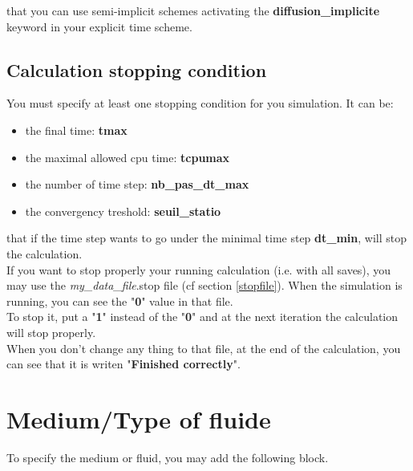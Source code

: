 \Note that you can use semi-implicit schemes activating the \textbf{diffusion\_implicite} keyword in your explicit time scheme.



\subsection{Calculation stopping condition}
You must specify at least one stopping condition for you simulation.
It can be:
\begin{itemize}
\item the final time: \textbf{tmax}
\item the maximal allowed cpu time: \textbf{tcpumax}
\item the number of time step: \textbf{nb\_pas\_dt\_max}
\item the convergency treshold: \textbf{seuil\_statio}
\end{itemize}

\Note that if the time step wants to go under the minimal time step \textbf{dt\_min}, \trust will stop the calculation.\\

If you want to stop properly your running calculation (i.e. with all saves), you may use the \textit{my\_data\_file}.stop file (cf section \ref{stopfile}).
When the simulation is running, you can see the "\textbf{0}" value in that file.\\

To stop it, put a "\textbf{1}" instead of the "\textbf{0}" and at the next iteration the calculation will stop properly.\\

When you don't change any thing to that file, at the end of the calculation, you can see that it is writen "\textbf{Finished correctly}".


\section{Medium/Type of fluide}
To specify the medium or fluid, you may add the following block.

    \begin{center}
    \end{center}

